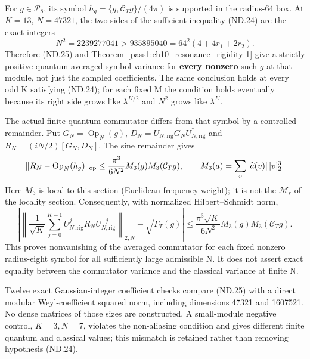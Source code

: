 For \(g\in\mathcal P_8\), its symbol \(h_g=\{g,\mathcal C_Tg\}/(4\pi)\) is supported in the radius-64 box. At \(K=13\), \(N=47321\), the two sides of the sufficient inequality (ND.24) are the exact integers \[
 N^2=2239277041>935895040=64^2(4+4r_1+2r_2).
\] Therefore (ND.25) and Theorem~\ref{pass1:ch10_resonance_rigidity-1} give a strictly positive quantum averaged-symbol variance for \textbf{every nonzero} such \(g\) at that module, not just the sampled coefficients. The same conclusion holds at every odd K satisfying (ND.24); for each fixed M the condition holds eventually because its right side grows like \(\lambda^{K/2}\) and \(N^2\) grows like \(\lambda^K\).

The actual finite quantum commutator differs from that symbol by a controlled remainder. Put \(G_N=\operatorname{Op}_N(g)\), \(D_N=U_{N,\mathrm{rig}}G_NU_{N,\mathrm{rig}}^*\) and \(R_N=(iN/2)[G_N,D_N]\). The sine remainder gives \[
 \|R_N-\operatorname{Op}_N(h_g)\|_{\rm op}
     \leq\frac{\pi^3}{6N^2}M_3(g)M_3(\mathcal C_Tg),
 \qquad M_3(a)=\sum_v|\widehat a(v)|\,|v|_2^3.
\]
Here \(M_3\) is local to this section (Euclidean frequency weight); it is
not the \(\mathcal M_r\) of the locality section. Consequently, with normalized Hilbert--Schmidt norm, \[
 \left|\left\|\frac1{\sqrt K}\sum_{j=0}^{K-1}U_{N,\mathrm{rig}}^jR_NU_{N,\mathrm{rig}}^{-j}\right\|_{2,N}
                      -\sqrt{\Gamma_T(g)}\right|
 \leq\frac{\pi^3\sqrt K}{6N^2}M_3(g)M_3(\mathcal C_Tg).      \tag{ND.27}
\] This proves nonvanishing of the averaged commutator for each fixed nonzero radius-eight symbol for all sufficiently large admissible N. It does not assert exact equality between the commutator variance and the classical variance at finite N.

Twelve exact Gaussian-integer coefficient checks compare (ND.25) with a direct modular Weyl-coefficient squared norm, including dimensions 47321 and 1607521. No dense matrices of those sizes are constructed. A small-module negative control, \(K=3,N=7\), violates the non-aliasing condition and gives different finite quantum and classical values; this mismatch is retained rather than removing hypothesis (ND.24).
